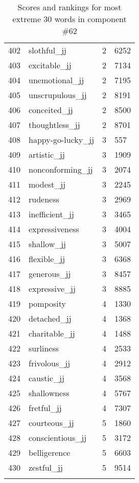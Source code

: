 \begin{longtable}[!htbp]{| rlr@{.}l |}
    402 & slothful\_jj & 2 & 6252 \\
    403 & excitable\_jj & 2 & 7134 \\
    404 & unemotional\_jj & 2 & 7195 \\
    405 & unscrupulous\_jj & 2 & 8191 \\
    406 & conceited\_jj & 2 & 8500 \\
    407 & thoughtless\_jj & 2 & 8701 \\
    408 & happy-go-lucky\_jj & 3 & 557 \\
    409 & artistic\_jj & 3 & 1909 \\
    410 & nonconforming\_jj & 3 & 2074 \\
    411 & modest\_jj & 3 & 2245 \\
    412 & rudeness & 3 & 2969 \\
    413 & inefficient\_jj & 3 & 3465 \\
    414 & expressiveness & 3 & 4004 \\
    415 & shallow\_jj & 3 & 5007 \\
    416 & flexible\_jj & 3 & 6368 \\
    417 & generous\_jj & 3 & 8457 \\
    418 & expressive\_jj & 3 & 8885 \\
    419 & pomposity & 4 & 1330 \\
    420 & detached\_jj & 4 & 1368 \\
    421 & charitable\_jj & 4 & 1488 \\
    422 & surliness & 4 & 2533 \\
    423 & frivolous\_jj & 4 & 2912 \\
    424 & caustic\_jj & 4 & 3568 \\
    425 & shallowness & 4 & 5767 \\
    426 & fretful\_jj & 4 & 7307 \\
    427 & courteous\_jj & 5 & 1860 \\
    428 & conscientious\_jj & 5 & 3172 \\
    429 & belligerence & 5 & 6603 \\
    430 & zestful\_jj & 5 & 9514 \\
    \hline
    \caption{Scores and rankings for most extreme 30 words in component \#62} \\
\end{longtable}
